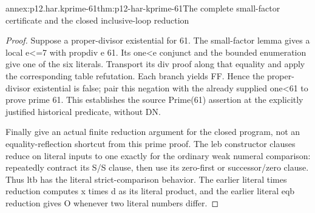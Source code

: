 \begin{annexitem}{annex:p12.har.kprime-61}{thm:p12-har-kprime-61}{The complete small-factor certificate and the closed inclusive-loop reduction}
\begin{proof}
Suppose a proper-divisor existential for 61. The small-factor lemma
gives a local e<=7 with propdiv e 61. Its one<e conjunct and the
bounded enumeration give one of the six literals. Transport its div
proof along that equality and apply the corresponding table refutation.
Each branch yields FF. Hence the proper-divisor existential is false;
pair this negation with the already supplied one<61 to prove prime 61.
This establishes the source Prime(61) assertion at the explicitly
justified historical predicate, without DN.

Finally give an actual finite reduction argument for the closed program,
not an equality-reflection shortcut from this prime proof. The leb
constructor clauses reduce on literal inputs to one exactly for the
ordinary weak numeral comparison: repeatedly contract its S/S clause,
then use its zero-first or successor/zero clause. Thus ltb has the
literal strict-comparison behavior. The earlier literal times reduction
computes x times d as its literal product, and the earlier literal
eqb reduction gives O whenever two literal numbers differ.


\end{proof}
\end{annexitem}
